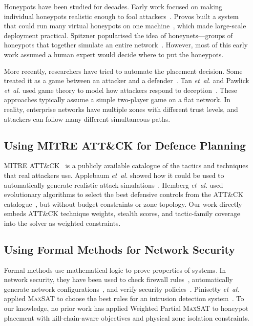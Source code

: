 \documentclass[journal]{IEEEtran}
\newcommand{\etal}{\emph{et~al.}}
\newcommand{\maxsat}{\textsc{MaxSAT}}
\begin{document}
Honeypots have been studied for decades.
Early work focused on making individual honeypots realistic
enough to fool attackers~\cite{spitzner2003}.
Provos built a system that could run many virtual honeypots
on one machine~\cite{provos2004}, which made large-scale
deployment practical.
Spitzner popularised the idea of honeynets---groups of
honeypots that together simulate an entire
network~\cite{spitzner2003}.
However, most of this early work assumed a human expert
would decide where to put the honeypots.

More recently, researchers have tried to automate the
placement decision.
Some treated it as a game between an attacker and a
defender~\cite{yuill2004}.
Tan \etal{} and Pawlick \etal{} used game theory to model
how attackers respond to deception~\cite{tan2011,pawlick2019}.
These approaches typically assume a simple two-player game
on a flat network.
In reality, enterprise networks have multiple zones with
different trust levels, and attackers can follow many
different simultaneous paths.

\subsection{Using MITRE ATT\&CK for Defence Planning}

MITRE ATT\&CK~\cite{mitre2023} is a publicly available
catalogue of the tactics and techniques that real attackers
use.
Applebaum \etal{} showed how it could be used to
automatically generate realistic attack
simulations~\cite{applebaum2016}.
Hemberg \etal{} used evolutionary algorithms to select the
best defensive controls from the ATT\&CK
catalogue~\cite{hemberg2020}, but without budget constraints
or zone topology.
Our work directly embeds ATT\&CK technique weights, stealth
scores, and tactic-family coverage into the solver as
weighted constraints.

\subsection{Using Formal Methods for Network Security}

Formal methods use mathematical logic to prove properties of
systems.
In network security, they have been used to check firewall
rules~\cite{al2011}, automatically generate network
configurations~\cite{jeffrey2009}, and verify security
policies~\cite{fisler2005}.
Pinisetty \etal{} applied \maxsat{} to choose the best rules
for an intrusion detection system~\cite{pinisetty2017}.
To our knowledge, no prior work has applied Weighted Partial
\maxsat{} to honeypot placement with kill-chain-aware
objectives and physical zone isolation constraints.
\end{document}

